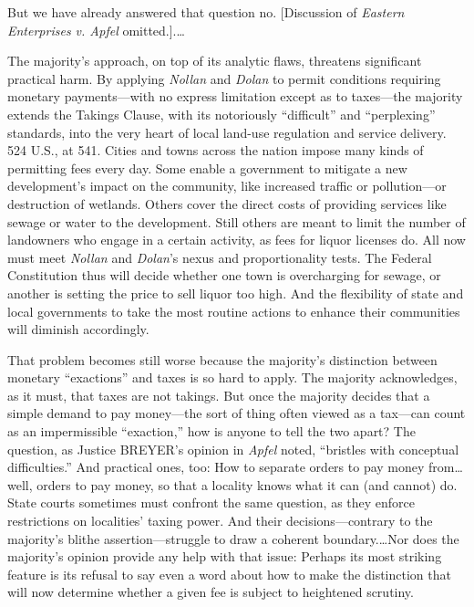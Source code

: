 But we have already answered that question no. [Discussion of \textit{Eastern
Enterprises v. Apfel} omitted.].\ldots

The majority's approach, on top of its analytic flaws, threatens significant
practical harm. By applying \textit{Nollan} and \textit{Dolan} to permit
conditions requiring monetary payments---with no express limitation except as to
taxes---the majority extends the Takings Clause, with its notoriously
``difficult'' and ``perplexing'' standards, into the very heart of local
land-use regulation and service delivery. 524 U.S., at 541. Cities and towns
across the nation impose many kinds of permitting fees every day. Some enable a
government to mitigate a new development's impact on the community, like
increased traffic or pollution---or destruction of wetlands. Others cover the
direct costs of providing services like sewage or water to the development.
Still others are meant to limit the number of landowners who engage in a certain
activity, as fees for liquor licenses do. All now must meet \textit{Nollan} and
\textit{Dolan}'s nexus and proportionality tests. The Federal Constitution thus
will decide whether one town is overcharging for sewage, or another is setting
the price to sell liquor too high. And the flexibility of state and local
governments to take the most routine actions to enhance their communities will
diminish accordingly.

That problem becomes still worse because the majority's distinction between
monetary ``exactions'' and taxes is so hard to apply. The majority acknowledges,
as it must, that taxes are not takings. But once the majority decides that a
simple demand to pay money---the sort of thing often viewed as a tax---can count
as an impermissible ``exaction,'' how is anyone to tell the two apart? The
question, as Justice BREYER's opinion in \textit{Apfel} noted, ``bristles with
conceptual difficulties.'' And practical ones, too: How to separate orders to
pay money from\ldots well, orders to pay money, so that a locality knows what it
can (and cannot) do. State courts sometimes must confront the same question, as
they enforce restrictions on localities' taxing power. And their
decisions---contrary to the majority's blithe assertion---struggle to draw a
coherent boundary.\ldots Nor does the majority's opinion provide any help with
that issue: Perhaps its most striking feature is its refusal to say even a word
about how to make the distinction that will now determine whether a given fee is
subject to heightened scrutiny.

